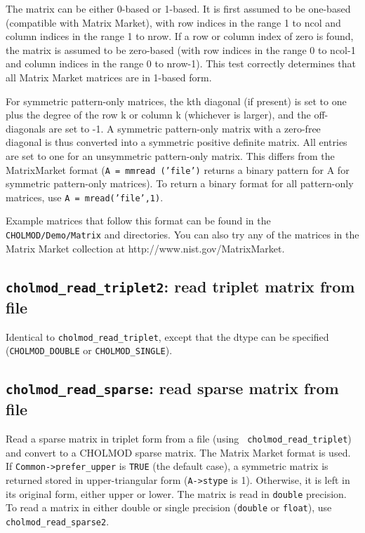 \documentclass[11pt]{article}
\begin{document}
The matrix can be either 0-based or 1-based.  It is first assumed to be
one-based (compatible with Matrix Market), with row indices in the range 1 to
ncol and column indices in the range 1 to nrow.  If a row or column index of
zero is found, the matrix is assumed to be zero-based (with row indices in the
range 0 to ncol-1 and column indices in the range 0 to nrow-1).  This test
correctly determines that all Matrix Market matrices are in 1-based form.

For symmetric pattern-only matrices, the kth diagonal (if present) is set to
one plus the degree of the row k or column k (whichever is larger), and the
off-diagonals are set to -1.  A symmetric pattern-only matrix with a zero-free
diagonal is thus converted into a symmetric positive definite matrix.  All
entries are set to one for an unsymmetric pattern-only matrix.  This differs
from the MatrixMarket format ({\tt A = mmread ('file')} returns a binary
pattern for A for symmetric pattern-only matrices).  To return a binary format
for all pattern-only matrices, use {\tt A = mread('file',1)}.

Example matrices that follow this format can be found in the {\tt
CHOLMOD/Demo/Matrix} and  directories.  You
can also try any of the matrices in the Matrix Market collection at
http://www.nist.gov/MatrixMarket.

\subsection{{\tt cholmod\_read\_triplet2}: read triplet matrix from file}


Identical to \verb'cholmod_read_triplet', except that the dtype can be
specified (\verb'CHOLMOD_DOUBLE' or \verb'CHOLMOD_SINGLE').

\subsection{{\tt cholmod\_read\_sparse}: read sparse matrix from file}


Read a sparse matrix in triplet form from a file (using {\tt
cholmod\_read\_triplet}) and convert to a CHOLMOD sparse matrix.  The Matrix
Market format is used.  If {\tt Common->prefer\_upper} is {\tt TRUE} (the
default case), a symmetric matrix is returned stored in upper-triangular form
({\tt A->stype} is 1).  Otherwise, it is left in its original form, either
upper or lower.
%
The matrix is read in {\tt double} precision.  To read a matrix
in either double or single precision ({\tt double} or {\tt float}),
use \verb'cholmod_read_sparse2'.
\end{document}
